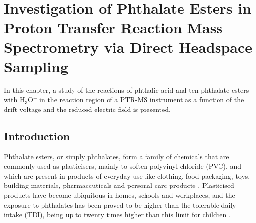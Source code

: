\chapter{Investigation of Phthalate Esters in Proton Transfer Reaction Mass Spectrometry via Direct Headspace Sampling}\label{chapter:PH}








In this chapter, a study of the reactions of phthalic acid and ten phthalate esters with H$_3$O$^+$ in the reaction region of a PTR-MS instrument as a function of the drift voltage and the reduced electric field is presented.


\section{Introduction}

Phthalate esters, or simply phthalates, form a family of chemicals that are commonly used as plasticisers, mainly to soften polyvinyl chloride (PVC), and which are present in products of everyday use like clothing, food packaging, toys, building materials, pharmaceuticals and personal care products \cite{graham1973phthalate,cao2010phthalate,schettler2006human}.  
%
%
Plasticised products have become ubiquitous in  homes, schools and workplaces, and the exposure to phthalates has been proved to be higher than the tolerable daily intake (\acrshort{TDI}), being up to twenty times higher than this limit for children 
\cite{heudorf2007phthalates,lorz2000phthalic}.
%








